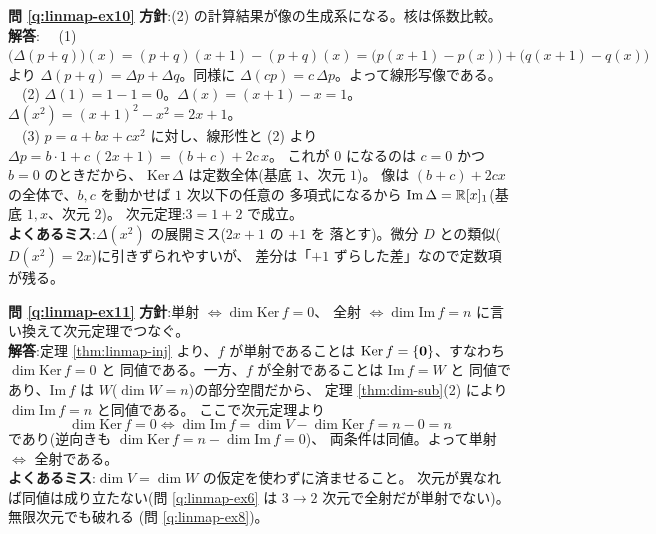 \bigskip
\noindent\textbf{問 \ref{q:linmap-ex10}}\quad
\textbf{方針}:(2) の計算結果が像の生成系になる。核は係数比較。\\
\textbf{解答}:
　(1) $\bigl(\Delta(p + q)\bigr)(x) = (p + q)(x + 1) - (p + q)(x)
= \bigl(p(x + 1) - p(x)\bigr) + \bigl(q(x + 1) - q(x)\bigr)$ より
$\Delta(p + q) = \Delta p + \Delta q$。同様に
$\Delta(cp) = c\,\Delta p$。よって線形写像である。\\
　(2) $\Delta(1) = 1 - 1 = 0$。$\Delta(x) = (x + 1) - x = 1$。
$\Delta(x^2) = (x + 1)^2 - x^2 = 2x + 1$。\\
　(3) $p = a + bx + cx^2$ に対し、線形性と (2) より
$\Delta p = b \cdot 1 + c\,(2x + 1) = (b + c) + 2c\,x$。
これが $0$ になるのは $c = 0$ かつ $b = 0$ のときだから、
$\mathrm{Ker}\,\Delta$ は定数全体(基底 $1$、次元 $1$)。
像は $(b + c) + 2cx$ の全体で、$b, c$ を動かせば $1$ 次以下の任意の
多項式になるから $\mathrm{Im}\,\Delta = \mathbb{R}[x]_1$(基底 $1, x$、次元 $2$)。
次元定理:$3 = 1 + 2$ で成立。\\
\textbf{よくあるミス}:$\Delta(x^2)$ の展開ミス($2x + 1$ の $+1$ を
落とす)。微分 $D$ との類似($D(x^2) = 2x$)に引きずられやすいが、
差分は「$+1$ ずらした差」なので定数項が残る。

\bigskip
\noindent\textbf{問 \ref{q:linmap-ex11}}\quad
\textbf{方針}:単射 $\iff \dim \mathrm{Ker}\,f = 0$、
全射 $\iff \dim \mathrm{Im}\,f = n$ に言い換えて次元定理でつなぐ。\\
\textbf{解答}:定理 \ref{thm:linmap-inj} より、$f$ が単射であることは
$\mathrm{Ker}\,f = \{\bm{0}\}$、すなわち $\dim \mathrm{Ker}\,f = 0$ と
同値である。一方、$f$ が全射であることは $\mathrm{Im}\,f = W$ と
同値であり、$\mathrm{Im}\,f$ は $W$($\dim W = n$)の部分空間だから、
定理 \ref{thm:dim-sub}(2) により $\dim \mathrm{Im}\,f = n$ と同値である。
ここで次元定理より
\[
\dim \mathrm{Ker}\,f = 0
\iff \dim \mathrm{Im}\,f = \dim V - \dim \mathrm{Ker}\,f = n - 0 = n
\]
であり(逆向きも $\dim \mathrm{Ker}\,f = n - \dim \mathrm{Im}\,f = 0$)、
両条件は同値。よって単射 $\iff$ 全射である。\\
\textbf{よくあるミス}:$\dim V = \dim W$ の仮定を使わずに済ませること。
次元が異なれば同値は成り立たない(問 \ref{q:linmap-ex6} は
$3 \to 2$ 次元で全射だが単射でない)。無限次元でも破れる
(問 \ref{q:linmap-ex8})。


